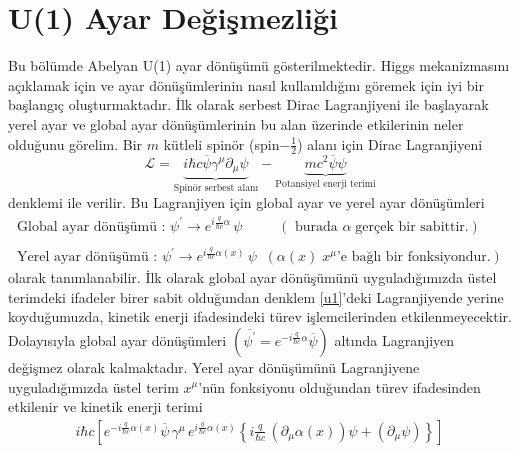 \section{U(1) Ayar Değişmezliği}
Bu bölümde Abelyan U(1) ayar dönüşümü gösterilmektedir. Higgs mekanizmasını açıklamak için ve ayar dönüşümlerinin nasıl kullanıldığını göremek için iyi bir başlangıç oluşturmaktadır. İlk olarak serbest Dirac Lagranjiyeni ile başlayarak yerel ayar ve global ayar dönüşümlerinin bu alan üzerinde etkilerinin neler olduğunu görelim. Bir $m$ kütleli spinör (spin$-\frac{1}{2}$) alanı için Dirac Lagranjiyeni
\begin{equation} \label{u1}
\mathcal{L} = \underbrace{ i\hbar c\overline{\psi}\gamma^{\mu}\partial_{\mu} \psi}_{\textrm{Spinör serbest alanı}} - \underbrace{mc{^2}\overline{\psi}\psi}_{\textrm{Potansiyel enerji terimi}}
\end{equation}
denklemi ile verilir. Bu Lagranjiyen için global ayar ve yerel ayar dönüşümleri
\begin{equation} \label{u2}
	\begin{aligned}
\textrm{Global ayar dönüşümü : }\psi^{'} \to e^{i \frac{q}{\hbar c}\alpha}\,\psi\;\qquad\;(\textrm{  burada }\alpha\; \textrm{gerçek bir sabittir.})\\ \\
\textrm{Yerel ayar dönüşümü  : } \psi^{'} \to e^{i \frac{q}{\hbar c} \alpha(x)}\,\psi\;\; (\alpha(x) \; x^{\mu} \textrm{'e bağlı bir fonksiyondur.})
	\end{aligned}
\end{equation}
olarak tanımlanabilir. İlk olarak global ayar dönüşümünü uyguladığımızda üstel terimdeki ifadeler birer sabit olduğundan denklem \eqref{u1}'deki Lagranjiyende yerine koyduğumuzda,  kinetik enerji ifadesindeki türev işlemcilerinden etkilenmeyecektir. Dolayısıyla global ayar dönüşümleri $(\overline{\psi^{'}} = e^{-i \frac{q}{\hbar c} \alpha}\overline{\psi})$ altında Lagranjiyen değişmez olarak kalmaktadır. Yerel ayar dönüşümünü Lagranjiyene uyguladığımızda üstel terim $x^{\mu}$'nün fonksiyonu olduğundan türev ifadesinden etkilenir ve kinetik enerji terimi
\begin{equation*}
\begin{aligned}
i\hbar c \left[ e^{-i \frac{q}{\hbar c} \alpha(x)} \overline{\psi} \,\gamma^{\mu}\,e^{i \frac{q}{\hbar c} \alpha(x)} \left\lbrace  i\frac{q}{\hbar c} \, ( \partial_{\mu}\alpha(x) )\psi + ( \partial_{\mu} \psi) \right\rbrace \right]\\
\\
\end{aligned}
\end{equation*}
